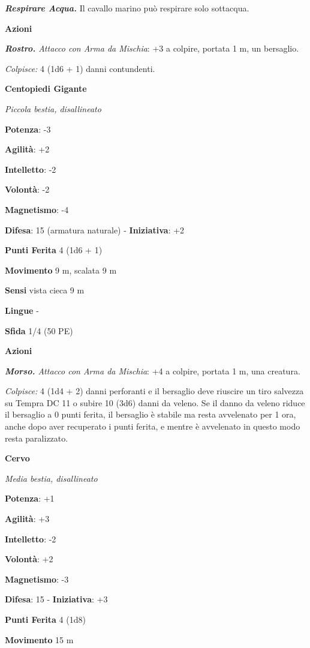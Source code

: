 \begin{multicols}{2}
\emph{\textbf{Respirare Acqua.}} Il cavallo marino può respirare solo
sottacqua.

\smallskip\textbf{Azioni}

\emph{\textbf{Rostro.} Attacco con Arma da Mischia}: +3 a colpire,
portata 1 m, un bersaglio.

\emph{Colpisce:} 4 (1d6 + 1) danni contundenti.

\textbf{Centopiedi Gigante}

\emph{Piccola bestia, disallineato}

\textbf{Potenza}: -3

\textbf{Agilità}: +2

\textbf{Intelletto}: -2

\textbf{Volontà}: -2

\textbf{Magnetismo}: -4

\textbf{Difesa}: 15 (armatura naturale) - \textbf{Iniziativa}: +2

\textbf{Punti Ferita} 4 (1d6 + 1)

\textbf{Movimento} 9 m, scalata 9 m

\textbf{Sensi} vista cieca 9 m

\textbf{Lingue} -

\textbf{Sfida} 1/4 (50 PE)\smallskip

\smallskip\textbf{Azioni}

\emph{\textbf{Morso.} Attacco con Arma da Mischia}: +4 a colpire,
portata 1 m, una creatura.

\emph{Colpisce:} 4 (1d4 + 2) danni perforanti e il bersaglio deve
riuscire un tiro salvezza su Tempra DC 11 o subire 10 (3d6) danni
da veleno. Se il danno da veleno riduce il bersaglio a 0 punti ferita,
il bersaglio è stabile ma resta avvelenato per 1 ora, anche dopo aver
recuperato i punti ferita, e mentre è avvelenato in questo modo resta
paralizzato.

\textbf{Cervo}

\emph{Media bestia, disallineato}

\textbf{Potenza}: +1

\textbf{Agilità}: +3

\textbf{Intelletto}: -2

\textbf{Volontà}: +2

\textbf{Magnetismo}: -3

\textbf{Difesa}: 15 - \textbf{Iniziativa}: +3

\textbf{Punti Ferita} 4 (1d8)

\textbf{Movimento} 15 m


\end{multicols}
